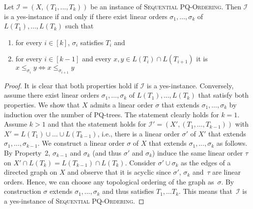 \documentclass[runningheads]{llncs}
\newcommand{\pqprob}{\textsc{Sequential PQ-Or\-der\-ing}\xspace}
\begin{document}
\begin{lemma}
  \label{lem:pqprobCharacterization}
  Let $\mathcal I = (X, (T_1, \dots, T_k))$ be an instance of \pqprob.
  Then $\mathcal I$ is a yes-instance if and only if there exist linear orders $\sigma_1, \dots, \sigma_k$ of $L(T_1), \dots, L(T_k)$ such that
  \begin{enumerate}
    \item for every $i \in [k]$, $\sigma_i$ satisfies $T_i$ and
    \item for every $i \in [k-1]$ and every $x, y \in L(T_i) \cap L(T_{i+1})$ it is $x \leq_{\sigma_{i}} y \Leftrightarrow x \leq_{\sigma_{i+1}} y$
  \end{enumerate}
\end{lemma}
\begin{proof}
  It is clear that both properties hold if $\mathcal I$ is a yes-instance.
  Conversely, assume there exist linear orders $\sigma_1, \dots, \sigma_k$
  of $L(T_1), \dots, L(T_k)$ that satisfy both properties.
We show that $X$ admits a linear order $\sigma$ that extends $\sigma_1, \dots, \sigma_k$ by induction over the number of PQ-trees.
  The statement clearly holds for $k = 1$.
  Assume $k>1$ and that the statement holds for $\mathcal I' = (X', (T_1,\dots,
  T_{k-1}))$ with $X' = {L(T_1) \cup \dots \cup L(T_{k-1})}$, i.e., there is a linear order $\sigma'$ of $X'$ that extends
  $\sigma_1, \dots, \sigma_{k-1}$.
  We construct a linear order $\sigma$ of $X$ that extends $\sigma_1, \dots, \sigma_k$ as follows. 
  By Property~2, $\sigma_{k-1}$ and $\sigma_k$ (and thus $\sigma'$ and $\sigma_k$) induce the same linear order
  $\tau$ on $X'\cap L(T_{k}) = L(T_{k-1})\cap L(T_k)$.
  Consider $\sigma'\cup \sigma_k$ as the edges of a directed graph on $X$ and
  observe that it is acyclic since $\sigma'$, $\sigma_k$ and~$\tau$ are linear
  orders. Hence, we can choose any topological ordering of the graph as~$\sigma$.
  By construction $\sigma$ extends $\sigma_1, \dots, \sigma_k$ and thus satisfies $T_1, \dots T_k$.
  This means that~$\mathcal I$ is a yes-instance of \pqprob.  
\end{proof}
\end{document}
